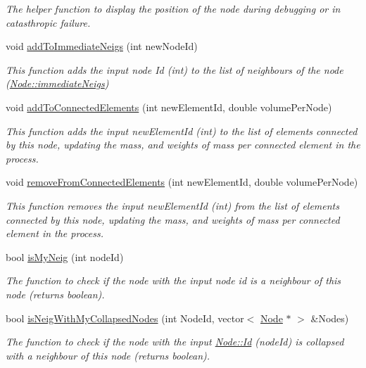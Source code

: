 \begin{DoxyCompactItemize}
\begin{DoxyCompactList}\small\item\em The helper function to display the position of the node during debugging or in catasthropic failure. \end{DoxyCompactList}\item 
void \hyperlink{classNode_ac2838f50304007a7cfe3df3f2e8d1772}{add\+To\+Immediate\+Neigs} (int new\+Node\+Id)
\begin{DoxyCompactList}\small\item\em This function adds the input node Id (int) to the list of neighbours of the node (\hyperlink{classNode_ab22060fb9f61a0d93ec52e6045828782}{Node\+::immediate\+Neigs}) \end{DoxyCompactList}\item 
void \hyperlink{classNode_a2c6f029aa3388b8fb122139b1d24b71b}{add\+To\+Connected\+Elements} (int new\+Element\+Id, double volume\+Per\+Node)
\begin{DoxyCompactList}\small\item\em This function adds the input new\+Element\+Id (int) to the list of elements connected by this node, updating the mass, and weights of mass per connected element in the process. \end{DoxyCompactList}\item 
void \hyperlink{classNode_a6dc9c26deadb9d2ca3e248f4748d9dfc}{remove\+From\+Connected\+Elements} (int new\+Element\+Id, double volume\+Per\+Node)
\begin{DoxyCompactList}\small\item\em This function removes the input new\+Element\+Id (int) from the list of elements connected by this node, updating the mass, and weights of mass per connected element in the process. \end{DoxyCompactList}\item 
bool \hyperlink{classNode_abc1e7e6c42b377c073a68c2b2ea97fa8}{is\+My\+Neig} (int node\+Id)
\begin{DoxyCompactList}\small\item\em The function to check if the node with the input node id is a neighbour of this node (returns boolean). \end{DoxyCompactList}\item 
bool \hyperlink{classNode_a5fcd3b2e58e0cdfd817371269494e1de}{is\+Neig\+With\+My\+Collapsed\+Nodes} (int Node\+Id, vector$<$ \hyperlink{classNode}{Node} $\ast$ $>$ \&Nodes)
\begin{DoxyCompactList}\small\item\em The function to check if the node with the input \hyperlink{classNode_a1bd379569cc1a8b96432e61971aed4d9}{Node\+::\+Id} (node\+Id) is collapsed with a neighbour of this node (returns boolean). \end{DoxyCompactList}\item 

\end{DoxyCompactItemize}
